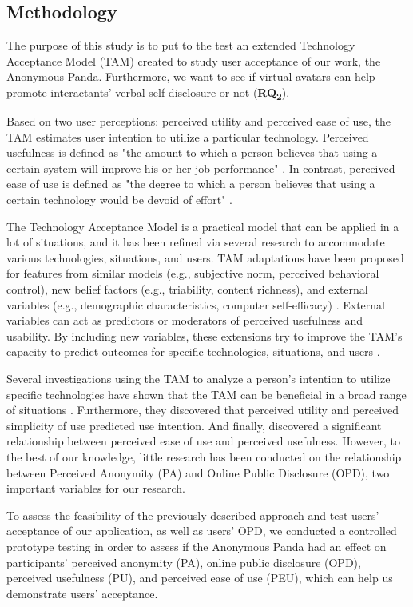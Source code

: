 \subsection{Methodology}
The purpose of this study is to put to the test an extended Technology Acceptance Model (TAM) created to study user acceptance of our work, the Anonymous Panda. Furthermore, we want to see if virtual avatars can help promote interactants' verbal self-disclosure or not (\textbf{RQ\textsubscript{2}}).

Based on two user perceptions: perceived utility and perceived ease of use, the TAM estimates user intention to utilize a particular technology. Perceived usefulness is defined as "the amount to which a person believes that using a certain system will improve his or her job performance" \cite{DAV89}. In contrast, perceived ease of use is defined as "the degree to which a person believes that using a certain technology would be devoid of effort" \cite{DAV89}.

The Technology Acceptance Model is a practical model that can be applied in a lot of situations, and it has been refined via several research to accommodate various technologies, situations, and users. TAM adaptations have been proposed for features from similar models (e.g., subjective norm, perceived behavioral control), new belief factors (e.g., triability, content richness), and external variables (e.g., demographic characteristics, computer self-efficacy) \cite{CAM20}. External variables can act as predictors or moderators of perceived usefulness and usability. By including new variables, these extensions try to improve the TAM's capacity to predict outcomes for specific technologies, situations, and users \cite{CAM20}.

Several investigations using the TAM to analyze a person's intention to utilize specific technologies have shown that the TAM can be beneficial in a broad range of situations \cite{CAM20}. Furthermore, they discovered that perceived utility and perceived simplicity of use predicted use intention. And finally, discovered a significant relationship between perceived ease of use and perceived usefulness. However, to the best of our knowledge, little research has been conducted on the relationship between Perceived Anonymity (PA) and Online Public Disclosure (OPD), two important variables for our research.

To assess the feasibility of the previously described approach and test users' acceptance of our application, as well as users' OPD, we conducted a controlled prototype testing in order to assess if the Anonymous Panda had an effect on participants' perceived anonymity (PA), online public disclosure (OPD), perceived usefulness (PU), and perceived ease of use (PEU), which can help us demonstrate users' acceptance.

